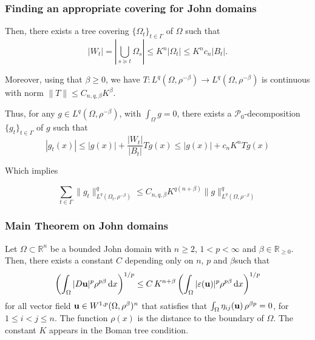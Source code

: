 \documentclass[small,xcolor=svgnames]{beamer}
\def\d{{\rm d}}
\def\O{\Omega}
\def\R{{\mathbb R}}
\def\uu{{\bf u}}
\def\P{\mathcal{P}}
\def\c{\color{blue}}
\begin{document}
\begin{frame}\frametitle{Finding an appropriate covering for John domains}

Then, there exists a tree covering $\{\O_t\}_{t\in\Gamma}$ of $\O$ such that 
{\c \[|W_t|=|\bigcup_{s\succeq t} \O_s|\leq K^n |\O_t|\leq K^n c_n|B_t|.\]}

Moreover,  using that $\beta\geq 0$, we have $T:L^q(\O,\rho^{-\beta})\to L^q(\O,\rho^{-\beta})$ is continuous with norm {\c $\|T\|\leq C_{n,q,\beta}K^\beta$}.


\bigskip

Thus,  for any  $g\in L^q(\O,\rho^{-\beta})$, with $\int_\O g=0$, there exists a  $\P_0$-decomposition $\{g_t\}_{t\in\Gamma}$ of $g$ such that 
\[|g_t(x)| \leq |g(x)|+\frac{|W_t|}{|B_t|}Tg(x)\leq |g(x)|+c_nK^nTg(x)\]

Which implies 

{\c \[\sum_{t\in \Gamma} \|g_t\|^q_{L^q(\O_t,\rho^{-\beta})}\leq C_{n,q,\beta} K^{q(n+\beta)}\|g\|^q_{L^q(\O,\rho^{-\beta})}\]}

\end{frame}



\begin{frame}\frametitle{Main Theorem on John domains}

\begin{theorem}\label{Korn in John} Let $\Omega\subset\R^n$ be a bounded John domain with $n\geq 2$, $1<p<\infty$ and $\beta\in\R_{\geq 0}$. Then, there exists a constant $C$ depending only on $n$, $p$ and $\beta$such that  
\begin{eqnarray*}
\left(\int_\Omega |D\uu|^p\rho^{p\beta}\, \d x\right)^{1/p} \leq C\,K^{n+\beta} \left(\int_\Omega |\varepsilon(\uu)|^p\rho^{p\beta}\, \d x\right)^{1/p}
\end{eqnarray*}
for all vector field $\uu\in W^{1,p}(\Omega,\rho^\beta)^n$ that satisfies that $\int_{\O}\eta_{ij}(\uu)\,\rho^{\beta p}=0$, for $1\leq i<j\leq n$. The function $\rho(x)$ is the distance to the boundary of $\Omega$. The constant $K$ appears in the Boman tree condition.
\end{theorem}

\end{frame}

\end{document}
